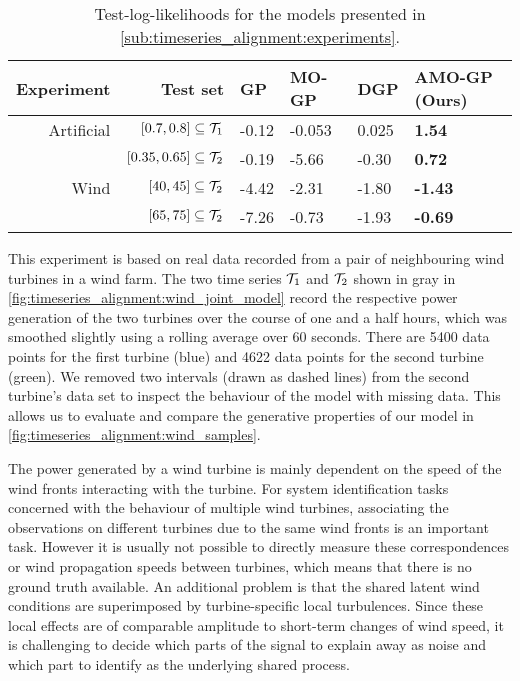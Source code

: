 \begin{table}[tp]
    \centering
    \caption{
        \label{tab:timeseries_alignment:dampened_sine_model_log_likelihoods}
        Test-log-likelihoods for the models presented in \cref{sub:timeseries_alignment:experiments}.
    }
    \begin{tabularx}{\linewidth}{rrYYYY}
        \toprule
        Experiment & Test set                       & GP    & MO-GP  & DGP   & AMO-GP (Ours)  \\
        \midrule
        Artificial & $[0.7, 0.8] \subseteq \mathcal{T}_1$   & -0.12 & -0.053 & 0.025 & \textbf{1.54}  \\
                   & $[0.35, 0.65] \subseteq \mathcal{T}_2$ & -0.19 & -5.66  & -0.30 & \textbf{0.72}  \\
        \midrule
        Wind       & $[40, 45] \subseteq \mathcal{T}_2 $    & -4.42 & -2.31  & -1.80 & \textbf{-1.43} \\
                   & $[65, 75] \subseteq \mathcal{T}_2 $    & -7.26 & -0.73  & -1.93 & \textbf{-0.69} \\
        \bottomrule
    \end{tabularx}
\end{table}
This experiment is based on real data recorded from a pair of neighbouring wind turbines in a wind farm.
The two time series $\mathcal{T}_1$ and $\mathcal{T}_2$ shown in gray in \cref{fig:timeseries_alignment:wind_joint_model} record the respective power generation of the two turbines over the course of one and a half hours, which was smoothed slightly using a rolling average over 60 seconds.
There are 5400 data points for the first turbine (blue) and 4622 data points for the second turbine (green).
We removed two intervals (drawn as dashed lines) from the second turbine's data set to inspect the behaviour of the model with missing data.
This allows us to evaluate and compare the generative properties of our model in \cref{fig:timeseries_alignment:wind_samples}.

The power generated by a wind turbine is mainly dependent on the speed of the wind fronts interacting with the turbine.
For system identification tasks concerned with the behaviour of multiple wind turbines, associating the observations on different turbines due to the same wind fronts is an important task.
However it is usually not possible to directly measure these correspondences or wind propagation speeds between turbines, which means that there is no ground truth available.
An additional problem is that the shared latent wind conditions are superimposed by turbine-specific local turbulences.
Since these local effects are of comparable amplitude to short-term changes of wind speed, it is challenging to decide which parts of the signal to explain away as noise and which part to identify as the underlying shared process.

